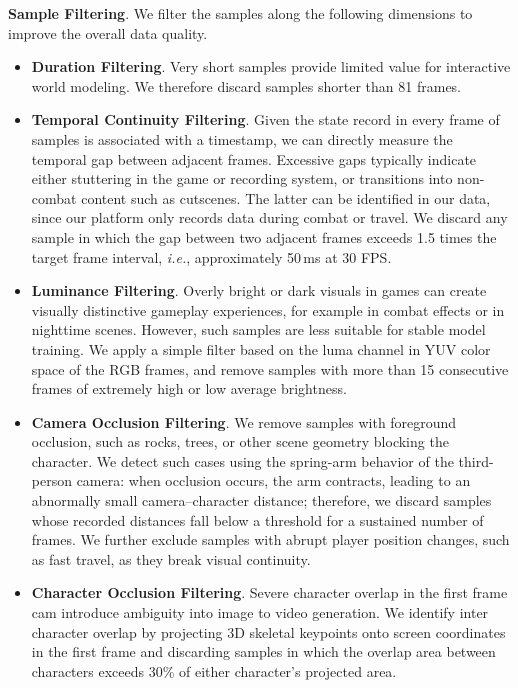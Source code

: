 \noindent
\textbf{Sample Filtering}.
We filter the samples along the following dimensions to improve the overall data quality.
\begin{itemize}
    \item \textbf{Duration Filtering}.
    Very short samples provide limited value for interactive world modeling. 
    We therefore discard samples shorter than 81 frames.
    
    \item \textbf{Temporal Continuity Filtering}.
    Given the state record in every frame of samples is associated with a timestamp, we can directly measure the temporal gap between adjacent frames. 
    Excessive gaps typically indicate either stuttering in the game or recording system, or transitions into non-combat content such as cutscenes. 
    The latter can be identified in our data, since our platform only records data during combat or travel.
    We discard any sample in which the gap between two adjacent frames exceeds 1.5 times the target frame interval, \textit{i.e.}, approximately 50\,ms at 30 FPS.

    \item \textbf{Luminance Filtering}.
    Overly bright or dark visuals in games can create visually distinctive gameplay experiences, for example in combat effects or in nighttime scenes.
    However, such samples are less suitable for stable model training.
    We apply a simple filter based on the luma channel in YUV color space of the RGB frames, and remove samples with more than 15 consecutive frames of extremely high or low average brightness.

    \item \textbf{Camera Occlusion Filtering}.
    We remove samples with foreground occlusion, such as rocks, trees, or other scene geometry blocking the character. 
    We detect such cases using the spring-arm behavior of the third-person camera: when occlusion occurs, the arm contracts, leading to an abnormally small camera–character distance; 
    therefore, we discard samples whose recorded distances fall below a threshold for a sustained number of frames.
    We further exclude samples with abrupt player position changes, such as fast travel, as they break visual continuity.

    \item \textbf{Character Occlusion Filtering}.
    Severe character overlap in the first frame cam introduce ambiguity into image to video generation.
    We identify inter character overlap by projecting 3D skeletal keypoints onto screen coordinates in the first frame and discarding samples in which the overlap area between characters exceeds 30\% of either character's projected area.
\end{itemize}

